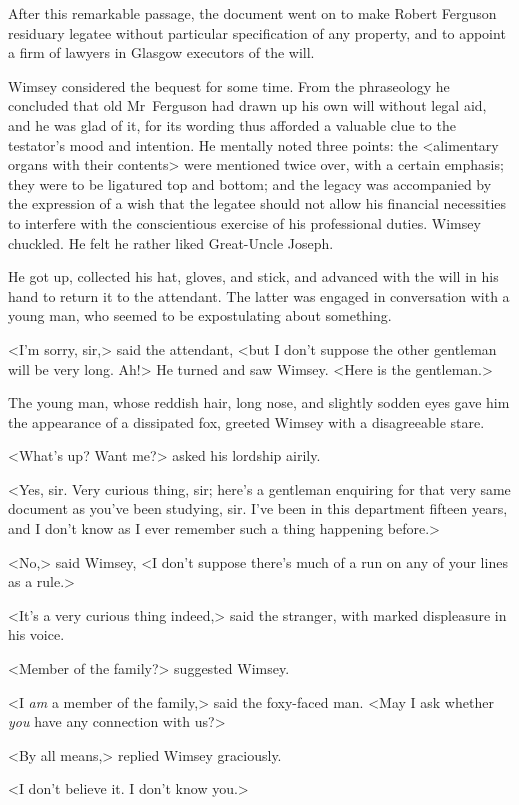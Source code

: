 After this remarkable passage, the document went on to make Robert Ferguson residuary legatee without particular specification of any property, and to appoint a firm of lawyers in Glasgow executors of the will.

Wimsey considered the bequest for some time. From the phraseology he concluded that old Mr~Ferguson had drawn up his own will without legal aid, and he was glad of it, for its wording thus afforded a valuable clue to the testator's mood and intention. He mentally noted three points: the <alimentary organs with their contents> were mentioned twice over, with a certain emphasis; they were to be ligatured top and bottom; and the legacy was accompanied by the expression of a wish that the legatee should not allow his financial necessities to interfere with the conscientious exercise of his professional duties. Wimsey chuckled. He felt he rather liked Great-Uncle Joseph.

He got up, collected his hat, gloves, and stick, and advanced with the will in his hand to return it to the attendant. The latter was engaged in conversation with a young man, who seemed to be expostulating about something.

<I'm sorry, sir,> said the attendant, <but I don't suppose the other gentleman will be very long. Ah!> He turned and saw Wimsey. <Here is the gentleman.>

The young man, whose reddish hair, long nose, and slightly sodden eyes gave him the appearance of a dissipated fox, greeted Wimsey with a disagreeable stare.

<What's up? Want me?> asked his lordship airily.

<Yes, sir. Very curious thing, sir; here's a gentleman enquiring for that very same document as you've been studying, sir. I've been in this department fifteen years, and I don't know as I ever remember such a thing happening before.>

<No,> said Wimsey, <I don't suppose there's much of a run on any of your lines as a rule.>

<It's a very curious thing indeed,> said the stranger, with marked displeasure in his voice.

<Member of the family?> suggested Wimsey.

<I \textit{am} a member of the family,> said the foxy-faced man. <May I ask whether \textit{you} have any connection with us?>

<By all means,> replied Wimsey graciously.

<I don't believe it. I don't know you.>

